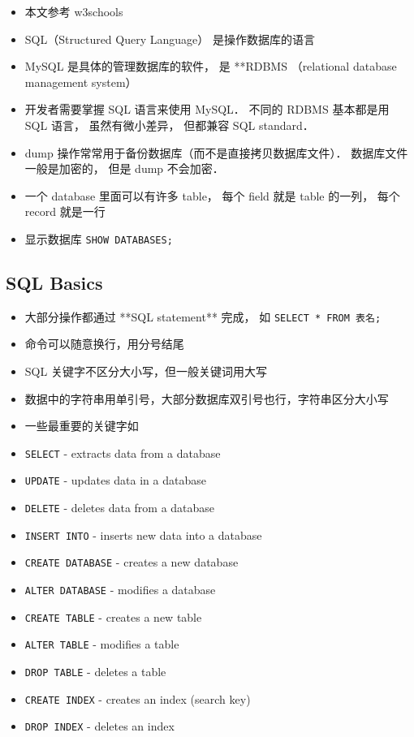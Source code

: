 
\begin{itemize}
\item 本文参考 w3schools
\item SQL（Structured Query Language） 是操作数据库的语言
\item MySQL 是具体的管理数据库的软件， 是 **RDBMS （relational database management system）
\item 开发者需要掌握 SQL 语言来使用 MySQL． 不同的 RDBMS 基本都是用 SQL 语言， 虽然有微小差异， 但都兼容 SQL standard．
\item dump 操作常常用于备份数据库（而不是直接拷贝数据库文件）． 数据库文件一般是加密的， 但是 dump 不会加密．
\item 一个 database 里面可以有许多 table， 每个 field 就是 table 的一列， 每个 record 就是一行
\item 显示数据库 \verb`SHOW DATABASES;`
\end{itemize}

\subsection{SQL Basics}
\begin{itemize}
\item 大部分操作都通过 **SQL statement** 完成， 如 \verb`SELECT * FROM 表名;`
\item 命令可以随意换行，用分号结尾
\item SQL 关键字不区分大小写，但一般关键词用大写
\item 数据中的字符串用单引号，大部分数据库双引号也行，字符串区分大小写
\item 一些最重要的关键字如
\item \verb`SELECT` - extracts data from a database
\item \verb`UPDATE` - updates data in a database
\item \verb`DELETE` - deletes data from a database
\item \verb`INSERT INTO` - inserts new data into a database
\item \verb`CREATE DATABASE` - creates a new database
\item \verb`ALTER DATABASE` - modifies a database
\item \verb`CREATE TABLE` - creates a new table
\item \verb`ALTER TABLE` - modifies a table
\item \verb`DROP TABLE` - deletes a table
\item \verb`CREATE INDEX` - creates an index (search key)
\item \verb`DROP INDEX` - deletes an index
\end{itemize}

